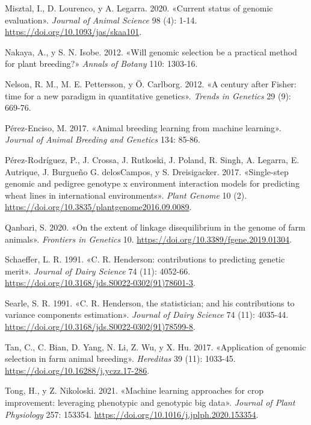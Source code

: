 \documentclass[11pt,spanish,a4paper,oneside,]{book} %
\begin{document}
\leavevmode\hypertarget{ref-cite:18}{}%
Misztal, I., D. Lourenco, y A. Legarra. 2020. «Current status of genomic evaluation». \emph{Journal of Animal Science} 98 (4): 1-14. \url{https://doi.org/10.1093/jas/skaa101}.

\leavevmode\hypertarget{ref-cite:6}{}%
Nakaya, A., y S. N. Isobe. 2012. «Will genomic selection be a practical method for plant breeding?» \emph{Annals of Botany} 110: 1303-16.

\leavevmode\hypertarget{ref-cite:2}{}%
Nelson, R. M., M. E. Pettersson, y Ö. Carlborg. 2012. «A century after Fisher: time for a new paradigm in quantitative genetics». \emph{Trends in Genetics} 29 (9): 669-76.

\leavevmode\hypertarget{ref-cite:5}{}%
Pérez-Enciso, M. 2017. «Animal breeding learning from machine learning». \emph{Journal of Animal Breeding and Genetics} 134: 85-86.

\leavevmode\hypertarget{ref-cite:19}{}%
Pérez-Rodríguez, P., J. Crossa, J. Rutkoski, J. Poland, R. Singh, A. Legarra, E. Autrique, J. Burgueño G. delosCampos, y S. Dreisigacker. 2017. «Single-step genomic and pedigree genotype x environment interaction models for predicting wheat lines in international environments». \emph{Plant Genome} 10 (2). \url{https://doi.org/10.3835/plantgenome2016.09.0089}.

\leavevmode\hypertarget{ref-cite:36}{}%
Qanbari, S. 2020. «On the extent of linkage disequilibrium in the genome of farm animals». \emph{Frontiers in Genetics} 10. \url{https://doi.org/10.3389/fgene.2019.01304}.

\leavevmode\hypertarget{ref-cite:27}{}%
Schaeffer, L. R. 1991. «C. R. Henderson: contributions to predicting genetic merit». \emph{Journal of Dairy Science} 74 (11): 4052-66. \url{https://doi.org/10.3168/jds.S0022-0302(91)78601-3}.

\leavevmode\hypertarget{ref-cite:29}{}%
Searle, S. R. 1991. «C. R. Henderson, the statistician; and his contributions to variance components estimation». \emph{Journal of Dairy Science} 74 (11): 4035-44. \url{https://doi.org/10.3168/jds.S0022-0302(91)78599-8}.

\leavevmode\hypertarget{ref-cite:34}{}%
Tan, C., C. Bian, D. Yang, N. Li, Z. Wu, y X. Hu. 2017. «Application of genomic selection in farm animal breeding». \emph{Hereditas} 39 (11): 1033-45. \url{https://doi.org/10.16288/j.yczz.17-286}.

\leavevmode\hypertarget{ref-cite:7}{}%
Tong, H., y Z. Nikoloski. 2021. «Machine learning approaches for crop improvement: leveraging phenotypic and genotypic big data». \emph{Journal of Plant Physiology} 257: 153354. \url{https://doi.org/10.1016/j.jplph.2020.153354}.
\end{document}
